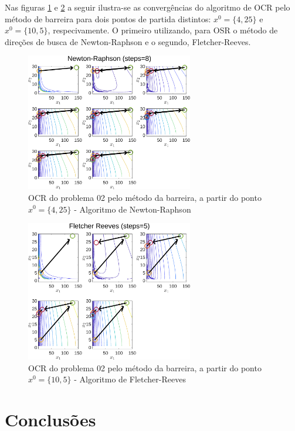 \documentclass[10pt, a4paper]{article}
\begin{document}
\newpage

Nas figuras \ref{fig:fig07} e \ref{fig:fig08} a seguir ilustra-se as converg\^encias do algoritmo de OCR pelo m\'etodo de barreira para dois pontos de partida distintos: $x^0=\{4,25\}$ e $x^0=\{10,5\}$, respecivamente. O primeiro utilizando, para OSR o m\'etodo de dire\c c\~oes de busca de Newton-Raphson e o segundo, Fletcher-Reeves.

\begin{figure}[H]
      \centering
      \includegraphics[width=0.65\textwidth]{fig07_P02_BAR_X1_NR.png}
      \caption{OCR do problema 02 pelo m\'etodo da barreira, a partir do ponto $x^0=\{4,25\}$ - Algoritmo de Newton-Raphson}
      \label{fig:fig07}
\end{figure}
\begin{figure}[H]
      \centering
      \includegraphics[width=0.65\textwidth]{fig08_P02_BAR_X2_FR.png}
      \caption{OCR do problema 02 pelo m\'etodo da barreira, a partir do ponto $x^0=\{10,5\}$ - Algoritmo de Fletcher-Reeves}
      \label{fig:fig08}
\end{figure}


\section{Conclus\~oes}
\end{document}
